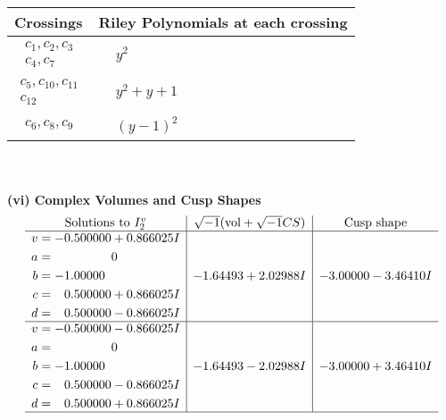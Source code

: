 \documentclass[1p]{elsarticle_modified}
\theoremstyle{definition}
\newcommand{\I}{\sqrt{-1}}
\begin{document}
\begin{tabular}{m{50pt}|m{274pt}}
Crossings & \hspace{64pt}Riley Polynomials at each crossing \\
\hline $$\begin{aligned}c_{1},c_{2},c_{3}\\c_{4},c_{7}\end{aligned}$$&$\begin{aligned}
&y^2
\end{aligned}$\\
\hline $$\begin{aligned}c_{5},c_{10},c_{11}\\c_{12}\end{aligned}$$&$\begin{aligned}
&y^2+y+1
\end{aligned}$\\
\hline $$\begin{aligned}c_{6},c_{8},c_{9}\end{aligned}$$&$\begin{aligned}
&(y-1)^2
\end{aligned}$\\
\hline
\end{tabular}\\~\\
\newpage\flushleft \textbf{(vi) Complex Volumes and Cusp Shapes}
$$\begin{array}{c|c|c}  
\text{Solutions to }I^v_{2}& \I (\text{vol} + \sqrt{-1}CS) & \text{Cusp shape}\\
 \hline 
\begin{aligned}
v &= -0.500000 + 0.866025 I \\
a &= \phantom{-0.000000 } 0 \\
b &= -1.00000\phantom{ +0.000000I} \\
c &= \phantom{-}0.500000 + 0.866025 I \\
d &= \phantom{-}0.500000 - 0.866025 I\end{aligned}
 & -1.64493 + 2.02988 I & -3.00000 - 3.46410 I \\ \hline\begin{aligned}
v &= -0.500000 - 0.866025 I \\
a &= \phantom{-0.000000 } 0 \\
b &= -1.00000\phantom{ +0.000000I} \\
c &= \phantom{-}0.500000 - 0.866025 I \\
d &= \phantom{-}0.500000 + 0.866025 I\end{aligned}
 & -1.64493 - 2.02988 I & -3.00000 + 3.46410 I\\
 \hline 
 \end{array}$$\newpage\newpage\renewcommand{\arraystretch}{1}
\end{document}
